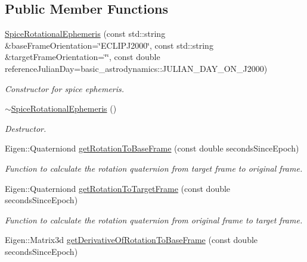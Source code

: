 \subsection*{Public Member Functions}
\begin{DoxyCompactItemize}
\item 
\hyperlink{classtudat_1_1ephemerides_1_1SpiceRotationalEphemeris_aa0b9c27bdb9bfd9f06f687f087f49382}{Spice\+Rotational\+Ephemeris} (const std\+::string \&base\+Frame\+Orientation=\char`\"{}E\+C\+L\+I\+P\+J2000\char`\"{}, const std\+::string \&target\+Frame\+Orientation=\char`\"{}\char`\"{}, const double reference\+Julian\+Day=basic\+\_\+astrodynamics\+::\+J\+U\+L\+I\+A\+N\+\_\+\+D\+A\+Y\+\_\+\+O\+N\+\_\+\+J2000)
\begin{DoxyCompactList}\small\item\em Constructor for spice ephemeris. \end{DoxyCompactList}\item 
\hyperlink{classtudat_1_1ephemerides_1_1SpiceRotationalEphemeris_a9cea9f1e90a771668c8ed23ff7275e86}{$\sim$\+Spice\+Rotational\+Ephemeris} ()
\begin{DoxyCompactList}\small\item\em Destructor. \end{DoxyCompactList}\item 
Eigen\+::\+Quaterniond \hyperlink{classtudat_1_1ephemerides_1_1SpiceRotationalEphemeris_ab3ac9ee4633524110222c0afb4c27bb4}{get\+Rotation\+To\+Base\+Frame} (const double seconds\+Since\+Epoch)
\begin{DoxyCompactList}\small\item\em Function to calculate the rotation quaternion from target frame to original frame. \end{DoxyCompactList}\item 
Eigen\+::\+Quaterniond \hyperlink{classtudat_1_1ephemerides_1_1SpiceRotationalEphemeris_abef7ce85bb808b2f7471ef59e3d3ac9c}{get\+Rotation\+To\+Target\+Frame} (const double seconds\+Since\+Epoch)
\begin{DoxyCompactList}\small\item\em Function to calculate the rotation quaternion from original frame to target frame. \end{DoxyCompactList}\item 
Eigen\+::\+Matrix3d \hyperlink{classtudat_1_1ephemerides_1_1SpiceRotationalEphemeris_ab99c74c3949251affc7829f28cd39671}{get\+Derivative\+Of\+Rotation\+To\+Base\+Frame} (const double seconds\+Since\+Epoch)
\item 

\end{DoxyCompactItemize}
